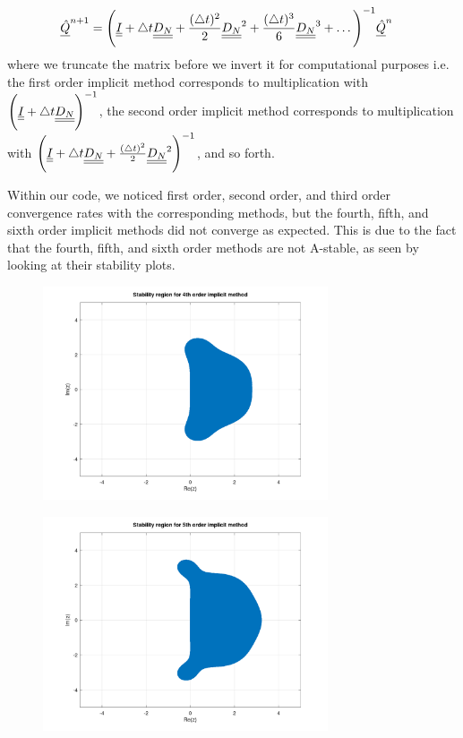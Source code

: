 \begin{align*}
	{\underline{\hat{Q}}}^{n+1} & = \Bigg( {\underline{\underline{I}}} + \triangle t {\underline{\underline{D_{N}}}} 
										   + \frac{(\triangle t)^{2}}{2} {\underline{\underline{D_{N}}}}^{2} 
										   + \frac{(\triangle t)^{3}}{6} {\underline{\underline{D_{N}}}}^{3}
										   + \hdots \Bigg)^{-1} {\underline{\hat{Q}}}^{n}
\end{align*}
where we truncate the matrix before we invert it for computational purposes i.e. the first order implicit method corresponds to multiplication with $\Bigg( {\underline{\underline{I}}} + \triangle t {\underline{\underline{D_{N}}}} \Bigg)^{-1}$, the second order implicit method corresponds to multiplication with $\Bigg( {\underline{\underline{I}}} + \triangle t {\underline{\underline{D_{N}}}} + \frac{(\triangle t)^{2}}{2} {\underline{\underline{D_{N}}}}^{2} \Bigg)^{-1}$, and so forth.
\par 
Within our code, we noticed first order, second order, and third order convergence rates with the corresponding methods, but the fourth, fifth, and sixth order implicit methods did not converge as expected. 
This is due to the fact that the fourth, fifth, and sixth order methods are not A-stable, as seen by looking at their stability plots.
\begin{figure}[H]
	\centering
	\includegraphics[width=0.75\textwidth]{fourth_order_stab_region.png}
\end{figure}

\begin{figure}[H]
	\centering
	\includegraphics[width=0.75\textwidth]{fifth_order_stab_region.png}
\end{figure}

